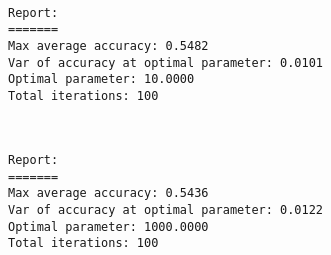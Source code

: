 \documentclass[11pt]{article}
\begin{document}
    \begin{center}
    \end{center}
    { \hspace*{\fill} \\}
    
    \begin{Verbatim}[commandchars=\\\{\}]
Report:
=======
Max average accuracy: 0.5482
Var of accuracy at optimal parameter: 0.0101
Optimal parameter: 10.0000
Total iterations: 100

    \end{Verbatim}

    \begin{center}
    \end{center}
    { \hspace*{\fill} \\}
    
    \begin{Verbatim}[commandchars=\\\{\}]
Report:
=======
Max average accuracy: 0.5436
Var of accuracy at optimal parameter: 0.0122
Optimal parameter: 1000.0000
Total iterations: 100

    \end{Verbatim}
\end{document}
